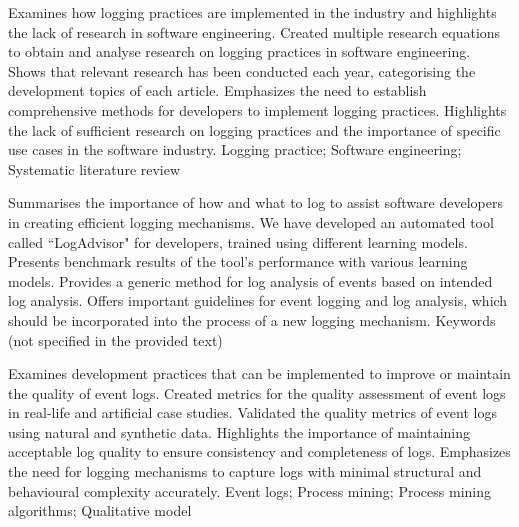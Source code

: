 {
    Examines how logging practices are implemented in the industry and highlights the lack of research in software engineering.
}
{
    Created multiple research equations to obtain and analyse research on logging practices in software engineering.
}
{
    Shows that relevant research has been conducted each year, categorising the development topics of each article.
}
{
    Emphasizes the need to establish comprehensive methods for developers to implement logging practices. Highlights the lack of sufficient research on logging practices and the importance of specific use cases in the software industry.
}
{
    Logging practice; Software engineering; Systematic literature review
}

{
    Summarises the importance of how and what to log to assist software developers in creating efficient logging mechanisms.
}
{
    We have developed an automated tool called “LogAdvisor" for developers, trained using different learning models.
}
{
    Presents benchmark results of the tool's performance with various learning models.
}
{
    Provides a generic method for log analysis of events based on intended log analysis. Offers important guidelines for event logging and log analysis, which should be incorporated into the process of a new logging mechanism.
}
{
    Keywords (not specified in the provided text)
}

{
    Examines development practices that can be implemented to improve or maintain the quality of event logs.
}
{
    Created metrics for the quality assessment of event logs in real-life and artificial case studies.
}
{
    Validated the quality metrics of event logs using natural and synthetic data.
}
{
    Highlights the importance of maintaining acceptable log quality to ensure consistency and completeness of logs. Emphasizes the need for logging mechanisms to capture logs with minimal structural and behavioural complexity accurately.
}
{
    Event logs; Process mining; Process mining algorithms; Qualitative model
}

